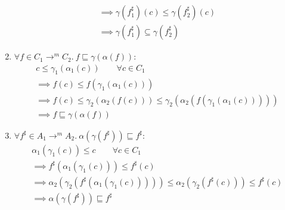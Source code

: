 \begin{exercise}
\begin{enumerate}[1.]
\begin{gather*}
            \implies \gamma(f^\sharp_1)(c) \leq \gamma(f^\sharp_2)(c) \\
            \implies \gamma(f^\sharp_1) \subseteq \gamma(f^\sharp_2)
        \end{gather*}
        \item $\forall f \in C_1 \to^m C_2.\ f \sqsubseteq \gamma(\alpha(f))$:
        \begin{gather*}
            c \leq \gamma_1 (\alpha_1 (c)) \qquad \forall c \in C_1 \\
            \implies f(c) \leq f(\gamma_1 (\alpha_1 (c))) \\
            \implies f(c) \leq \gamma_2(\alpha_2(f(c))) \leq \gamma_2(\alpha_2(f(\gamma_1 (\alpha_1 (c))))) \\
            \implies f \sqsubseteq \gamma(\alpha(f))
        \end{gather*}
        \item $\forall f^\sharp \in A_1 \to^m A_2.\ \alpha(\gamma(f^\sharp)) \sqsubseteq f^\sharp$:
        \begin{gather*}
            \alpha_1(\gamma_1(c)) \leq c \qquad \forall c \in C_1 \\
            \implies f^\sharp(\alpha_1(\gamma_1(c))) \leq f^\sharp(c) \\
            \implies \alpha_2(\gamma_2(f^\sharp(\alpha_1(\gamma_1(c))))) \leq \alpha_2(\gamma_2(f^\sharp(c))) \leq f^\sharp(c) \\
            \implies \alpha(\gamma(f^\sharp)) \sqsubseteq f^\sharp
        \end{gather*}
    \end{enumerate}
\end{exercise}
